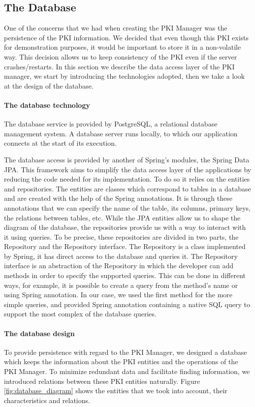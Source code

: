 \subsection{The Database}
One of the concerns that we had when creating the PKI Manager was the persistence of the PKI information. We decided that even though this PKI exists for demonstration purposes, it would be important to store it in a non-volatile way. This decision allows us to keep consistency of the PKI even if the server crashes/restarts. In this section we describe the data access layer of the PKI manager, we start by introducing the technologies adopted, then we take a look at the design of the database. 

\paragraph{The database technology}
The database service is provided by PostgreSQL, a relational database management system. A database server runs locally, to which our application connects at the start of its execution.

The database access is provided by another of Spring's modules, the Spring Data JPA. This framework aims to simplify the data access layer of the applications by reducing the code needed for its implementation. To do so it relies on the entities and repositories. The entities are classes which correspond to tables in a database and are created with the help of the Spring annotations. It is through these annotations that we can specify the name of the table, its columns, primary keys, the relations between tables, etc. While the JPA entities allow us to shape the diagram of the database, the repositories provide us with a way to interact with it using queries. To be precise, these repositories are divided in two parts, the Repository and the Repository interface. The Repository is a class implemented by Spring, it has direct access to the database and queries it. The Repository interface is an abstraction of the Repository in which the developer can add methods in order to specify the supported queries. This can be done in different ways, for example, it is possible to create a query from the method's name or using Spring annotation. In our case, we used the first method for the more simple queries, and provided Spring annotation containing a native SQL query to support the most complex of the database queries. 

\paragraph{The database design}
To provide persistence with regard to the PKI Manager, we designed a database which keeps the information about the PKI entities and the operations of the PKI Manager. To minimize redundant data and facilitate finding information, we introduced relations between these PKI entities naturally. Figure \ref{fig:database_diagram} shows the entities that we took into account, their characteristics and relations.



